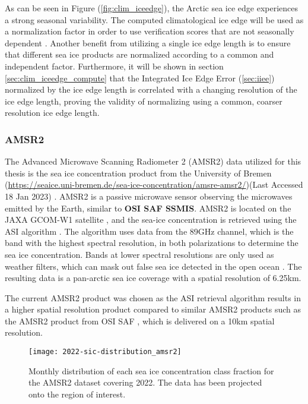 \documentclass[../main/thesis.tex]{subfiles}
\begin{document}
As can be seen in Figure (\ref{fig:clim_iceedge}), the Arctic sea ice edge experiences a strong seasonal variability. The computed climatological ice edge will be used as a normalization factor in order to use verification scores that are not seasonally dependent \citep{Goessling2016, Zampieri2019, Palerme2019}. Another benefit from utilizing a single ice edge length is to ensure that different sea ice products are normalized according to a common and independent factor. Furthermore, it will be shown in section \ref{sec:clim_iceedge_compute} that the Integrated Ice Edge Error \citep{Goessling2016} (\ref{sec:iiee}) normalized by the ice edge length is correlated with a changing resolution of the ice edge length, proving the validity of normalizing using a common, coarser resolution ice edge length.

\subsubsection{AMSR2}
\label{sec:amsr2}
The Advanced Microwave Scanning Radiometer 2 (AMSR2) data utilized for this thesis is the sea ice concentration product from the University of Bremen (\url{https://seaice.uni-bremen.de/sea-ice-concentration/amsre-amsr2/})(Last Accessed 18 Jan 2023) \citep{Spreen2008}. AMSR2 is a passive microwave sensor observing the microwaves emitted by the Earth, similar to \textbf{OSI SAF SSMIS}. AMSR2 is located on the JAXA GCOM-W1 satellite \cite{Melsheimer2019}, and the sea-ice concentration is retrieved using the ASI algorithm \cite{Spreen2008}. The algorithm uses data from the 89GHz channel, which is the band with the highest spectral resolution, in both polarizations to determine the sea ice concentration. Bands at lower spectral resolutions are only used as weather filters, which can mask out false sea ice detected in the open ocean \cite{Spreen2008}. The resulting data is a pan-arctic sea ice coverage with a spatial resolution of 6.25km.

The current AMSR2 product was chosen as the ASI retrieval algorithm \citep{Spreen2008} results in a higher spatial resolution product compared to similar AMSR2 products such as the AMSR2 product from OSI SAF \citep{Lavelle2016}, which is delivered on a 10km spatial resolution.

\begin{figure}
    \centering
    \texttt{[image: 2022-sic-distribution\_amsr2]}
    \caption{\label{fig:dist-amsr2}Monthly distribution of each sea ice concentration class fraction for the AMSR2 dataset covering 2022. The data has been projected onto the region of interest.}
\end{figure}
\end{document}
